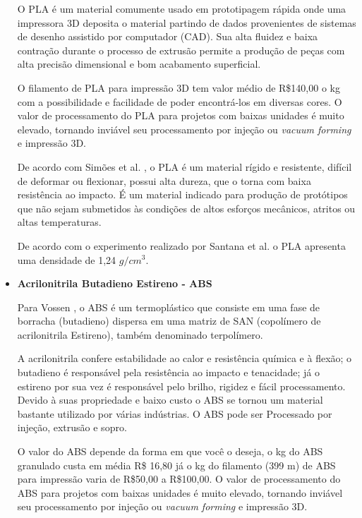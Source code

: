 \begin{itemize}
	\par O PLA é um material comumente usado em prototipagem rápida onde uma impressora 3D deposita o material partindo de dados provenientes de sistemas de desenho assistido por computador (CAD). Sua alta ﬂuidez e baixa contração durante o processo de extrusão permite a produção de peças com alta precisão dimensional e bom acabamento superﬁcial.
	
	\par O filamento de PLA para impressão 3D tem valor médio de R\$140,00 o kg com a possibilidade e facilidade de poder encontrá-los em diversas cores. O valor de processamento do PLA para projetos com baixas unidades é muito elevado, tornando inviável seu processamento por injeção ou \textit{vacuum forming} e impressão 3D. 
	
	\par De acordo com Simões et al. \cite{simoes2009mechanical}, o PLA é um material rígido e resistente, difícil de deformar ou ﬂexionar, possui alta dureza, que o torna com baixa resistência ao impacto. É um material indicado para produção de protótipos que não sejam submetidos às condições de altos esforços mecânicos, atritos ou altas temperaturas.
	
	\par De acordo com o experimento realizado por Santana et al. \cite{santana2018estudo} o PLA apresenta uma densidade de 1,24 $g/cm^3$.

    \item \textbf{Acrilonitrila Butadieno Estireno - ABS}
    
    \par Para  Vossen  \cite{vossen2009nanocompositos},  o  ABS é  um  termoplástico  que  consiste em uma  fase  de  borracha  (butadieno)  dispersa  em  uma  matriz de  SAN  (copolímero  de  acrilonitrila  Estireno),  também denominado terpolímero.
    
	\par A acrilonitrila confere estabilidade ao calor e resistência química e à flexão; o butadieno é responsável pela resistência ao impacto e tenacidade; já o estireno por sua vez é responsável pelo brilho, rigidez e fácil processamento. Devido à suas propriedade e baixo custo o ABS se tornou um material bastante utilizado por várias indústrias. O ABS pode ser Processado por injeção, extrusão e sopro.
	
	\par O valor do ABS depende da forma em que você o deseja, o kg do ABS granulado custa em média R\$ 16,80 já o kg do filamento (399 m) de ABS para impressão varia de R\$50,00 a R\$100,00. O valor de processamento do ABS para projetos com baixas unidades é muito elevado, tornando inviável seu processamento por injeção ou \textit{vacuum forming} e impressão 3D.
	

\end{itemize}
